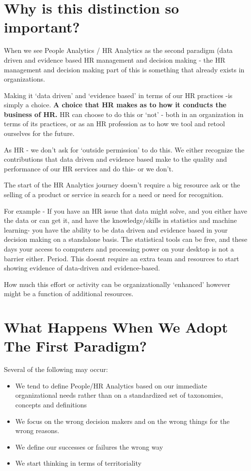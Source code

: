 \documentclass[12pt,letterpaper]{article}
\begin{document}
\section{Why is this distinction so
important?}\label{why-is-this-distinction-so-important}

When we see People Analytics / HR Analytics as the second paradigm (data
driven and evidence based HR management and decision making - the HR
management and decision making part of this is something that already
exists in organizations.

Making it `data driven' and `evidence based' in terms of our HR
practices -is simply a choice. \textbf{A choice that HR makes as to how
it conducts the business of HR.} HR can choose to do this or `not' -
both in an organization in terms of its practices, or as an HR
profession as to how we tool and retool ourselves for the future.

As HR - we don't ask for `outside permission' to do this. We either
recognize the contributions that data driven and evidence based make to
the quality and performance of our HR services and do this- or we don't.

The start of the HR Analytics journey doesn't require a big resource ask
or the selling of a product or service in search for a need or need for
recognition.

For example - If you have an HR issue that data might solve, and you
either have the data or can get it, and have the knowledge/skills in
statistics and machine learning- you have the ability to be data driven
and evidence based in your decision making on a standalone basis. The
statistical tools can be free, and these days your access to computers
and processing power on your desktop is not a barrier either. Period.
This doesnt require an extra team and resources to start showing
evidence of data-driven and evidence-based.

How much this effort or activity can be organizationally `enhanced'
however might be a function of additional resources.

\section{What Happens When We Adopt The First
Paradigm?}\label{what-happens-when-we-adopt-the-first-paradigm}

Several of the following may occur:

\begin{itemize}
\item
  We tend to define People/HR Analytics based on our immediate
  organizational needs rather than on a standardized set of taxonomies,
  concepts and definitions
\item
  We focus on the wrong decision makers and on the wrong things for the
  wrong reasons.
\item
  We define our successes or failures the wrong way
\item
  We start thinking in terms of territoriality
\end{itemize}
\end{document}
